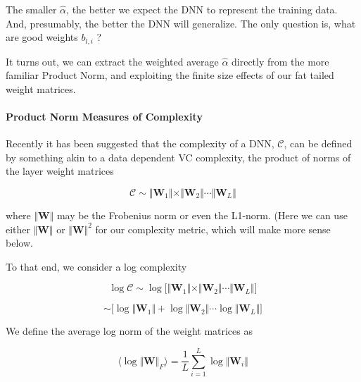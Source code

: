 The smaller $\hat{\alpha}$, the better we expect the DNN to represent the training data. And, presumably, the better the DNN will generalize.
The only question is, what are good weights $b_{l,i}$ ?

It turns out, we can extract the weighted average $\hat{\alpha}$ directly from the more familiar Product Norm, and exploiting the finite size effects of our fat tailed weight matrices.



\paragraph{Product Norm Measures of Complexity}

Recently it has been suggested that the complexity of a DNN, $\mathcal{C}$,  can be defined by something akin to a data dependent VC complexity, the product of norms of the layer weight matrices

$$\mathcal{C}\sim\Vert\mathbf{W}_{1}\Vert\times\Vert\mathbf{W}_{2}\Vert\cdots\Vert\mathbf{W}_{L}\Vert$$

where $\Vert\mathbf{W}\Vert$ may be the Frobenius norm or even the L1-norm.  (Here we can use either  $\Vert\mathbf{W}\Vert$ or $\Vert\mathbf{W}\Vert^{2}$ for our complexity metric, which will make more sense below.

To that end, we consider a log complexity

$$\log\mathcal{C}\sim\log\bigg[\Vert\mathbf{W}_{1}\Vert\times\Vert\mathbf{W}_{2}\Vert\cdots\Vert\mathbf{W}_{L}\Vert\bigg]$$

$$\sim\bigg[\log\Vert\mathbf{W}_{1}\Vert+\log\Vert\mathbf{W}_{2}\Vert\cdots\log\Vert\mathbf{W}_{L}\Vert\bigg]$$

We define the average log norm of the weight matrices as

$$\langle\log\Vert\mathbf{W}\Vert_{F}\rangle=\dfrac{1}{L}\sum_{i=1}^{L}\log\Vert\mathbf{W}_{i}\Vert$$

